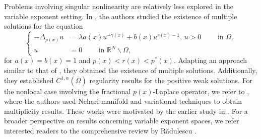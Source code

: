 \documentclass[11pt]{article}
\newcommand{\om} {\Omega}
\newcommand{\De} {\Delta}
\newcommand{\oline} {\overline}
\newcommand{\rnn}{\mathbb{R}^{N}}
\begin{document}
 
Problems involving singular nonlinearity are 
relatively less explored in the variable 
exponent setting.
In
\cite{C1_alpha_reg, Saoudi_2017}, the authors 
studied the existence of multiple solutions 
for the equation
\begin{equation*}
   \left\{
	\begin{aligned}
-\De_{p(x)}u&=\lambda a(x)u^{-\gamma(x)}+b(x)
u^{r(x)-1},\,u>0 \qquad \text{ in } \om,\\
u &= 0 \qquad \text{ in } \rnn\backslash\om,
	\end{aligned}
    \right.
\end{equation*}
for
$a(x)=b(x)=1$
and
$p(x)<r(x)<p^*(x).$
Adapting an approach similar to that of
\cite{Haito}, they obtained the existence 
of multiple solutions.
Additionally, they established
$C^{1,\alpha}(\oline\om)$
regularity results for the positive weak solutions.
For the nonlocal case involving the fractional
$p(x)$-Laplace operator, we refer to
\cite{Chammem_2}, where the authors used Nehari 
manifold and variational techniques to obtain 
multiplicity results.
These works were motivated by the earlier study in
\cite{Sweta_2020}.
For a broader perspective on results concerning 
variable exponent spaces, we refer interested 
readers to the comprehensive review by R\u{a}dulescu
\cite{RADULESCU_2015}.
\end{document}
